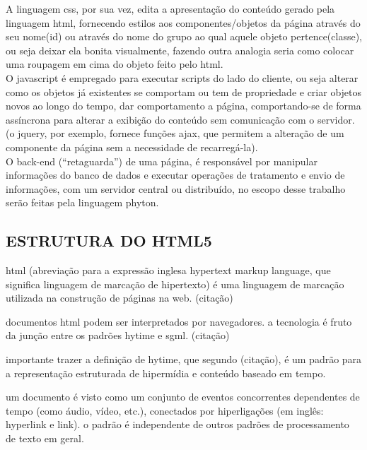 \begin{description}
			A linguagem css, por sua vez, edita a apresentação do conteúdo gerado pela linguagem html, fornecendo estilos aos componentes/objetos da página através do seu nome(id) ou através do nome do grupo ao qual aquele objeto pertence(classe), ou seja deixar ela bonita visualmente, fazendo outra analogia seria como colocar uma roupagem em cima do objeto feito pelo html.
			\cite{silva2007construindo}\\
						
			O javascript é empregado para executar scripts do lado do cliente, ou seja alterar como os objetos já existentes se comportam ou tem de propriedade e criar objetos novos ao longo do tempo, dar comportamento a página, comportando-se de forma assíncrona para alterar a exibição do conteúdo sem comunicação com o servidor. (o jquery, por exemplo, fornece funções ajax, que permitem a alteração de um componente da página sem a necessidade de recarregá-la). \cite{perez2019introduccion}\\
				
			O back-end (“retaguarda”) de uma página, é responsável por manipular informações do banco de dados e executar operações de tratamento e envio de informações, com um servidor central ou distribuído, no escopo desse trabalho serão feitas pela linguagem phyton. 
			\cite{alura}			
	\end{description} 	
	  
	\subsection{ESTRUTURA DO HTML5}
	\label{subsec:ESTRUTURAHTML5}
	
	html (abreviação para a expressão inglesa hypertext markup language, que significa linguagem de marcação de hipertexto) é uma linguagem de marcação utilizada na construção de páginas na web.  (citação) 
	
	documentos html podem ser interpretados por navegadores. a tecnologia é fruto da junção  entre os padrões hytime e sgml. (citação) 	
		
	importante trazer a definição de hytime, que segundo (citação),  é um padrão para a representação estruturada de hipermídia e conteúdo baseado em tempo.
	
	um documento é visto como um conjunto de eventos concorrentes dependentes de tempo (como áudio, vídeo, etc.), conectados por hiperligações (em inglês: hyperlink e link). o padrão é independente de outros padrões de processamento de texto em geral. 
	
